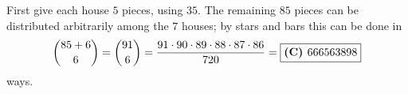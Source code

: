 First give each house $5$ pieces, using $35$. The remaining $85$ pieces can be distributed arbitrarily among the $7$ houses; by stars and bars this can be done in
\[\dbinom{85+6}{6}=\dbinom{91}{6}=\dfrac{91\cdot90\cdot89\cdot88\cdot87\cdot86}{720}=\boxed{\textbf{(C) }666563898}\]
ways.
